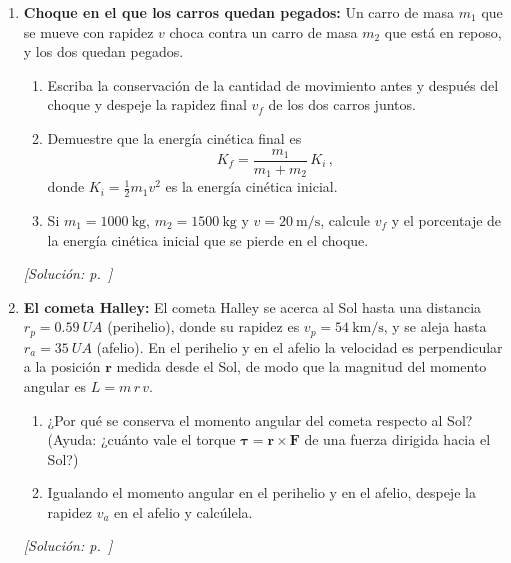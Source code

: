 \begin{enumerate}[label=\textbf{P\arabic*.}, ref=P\arabic*, leftmargin=*]
    \item\label{prob:parcial2-choque} \textbf{Choque en el que los carros
    quedan pegados:} Un carro de masa $m_1$ que se mueve con rapidez $v$
    choca contra un carro de masa $m_2$ que está en reposo, y los dos quedan
    pegados.
    \begin{enumerate}
        \item Escriba la conservación de la cantidad de movimiento antes y
        después del choque y despeje la rapidez final $v_f$ de los dos carros
        juntos.
        \item Demuestre que la energía cinética final es
        \begin{equation*}
            K_f = \frac{m_1}{m_1 + m_2}\,K_i\,,
        \end{equation*}
        donde $K_i = \tfrac{1}{2}m_1 v^2$ es la energía cinética inicial.
        \item Si $m_1 = \SI{1000}{\kilogram}$, $m_2 = \SI{1500}{\kilogram}$ y
        $v = \SI{20}{\meter\per\second}$, calcule $v_f$ y el porcentaje de la
        energía cinética inicial que se pierde en el choque.
    \end{enumerate}
    \hfill\textit{[Solución: p.~\pageref{sol:parcial2-choque}]}

    \item\label{prob:parcial2-cometa} \textbf{El cometa Halley:} El cometa
    Halley se acerca al Sol hasta una distancia $r_p = \SI{0.59}{UA}$
    (perihelio), donde su rapidez es $v_p = \SI{54}{\kilo\meter\per\second}$,
    y se aleja hasta $r_a = \SI{35}{UA}$ (afelio). En el perihelio y en el
    afelio la velocidad es perpendicular a la posición $\boldsymbol{r}$
    medida desde el Sol, de modo que la magnitud del momento angular es
    $L = m\,r\,v$.
    \begin{enumerate}
        \item ¿Por qué se conserva el momento angular del cometa respecto al
        Sol? (Ayuda: ¿cuánto vale el torque
        $\boldsymbol{\tau} = \boldsymbol{r}\times\boldsymbol{F}$ de una fuerza
        dirigida hacia el Sol?)
        \item Igualando el momento angular en el perihelio y en el afelio,
        despeje la rapidez $v_a$ en el afelio y calcúlela.
    \end{enumerate}
    \hfill\textit{[Solución: p.~\pageref{sol:parcial2-cometa}]}


\end{enumerate}
